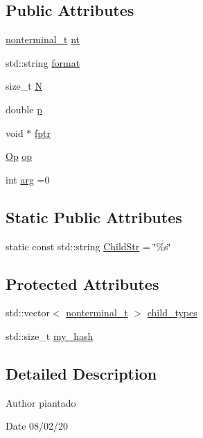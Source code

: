 \subsection*{Public Attributes}
\begin{DoxyCompactItemize}
\item 
\hyperlink{_nonterminal_8h_a1c5bfe9b903f69c83bbde5da7035fef3}{nonterminal\+\_\+t} \hyperlink{class_rule_a980385e76137909454bd6a585bd2e138}{nt}
\item 
std\+::string \hyperlink{class_rule_aa48c15aaaf5242afea0439607f2a2177}{format}
\item 
size\+\_\+t \hyperlink{class_rule_a0a2a742af39b60831ad1ac5eb5ba7498}{N}
\item 
double \hyperlink{class_rule_acd7e4d41d59dec76f60ca16238ab391a}{p}
\item 
void $\ast$ \hyperlink{class_rule_ac0bb1508823495574012004e00477d5e}{fptr}
\item 
\hyperlink{_ops_8h_a588e6b56097e045c733b60d25c4d45ab}{Op} \hyperlink{class_rule_ac98be91bb7865f73af2c0589fd657153}{op}
\item 
int \hyperlink{class_rule_a79eeb901b01047328f093d31724bd512}{arg} =0
\end{DoxyCompactItemize}
\subsection*{Static Public Attributes}
\begin{DoxyCompactItemize}
\item 
static const std\+::string \hyperlink{class_rule_a3ffb425ebd6c508ca47234e3800f769c}{Child\+Str} = \char`\"{}\%s\char`\"{}
\end{DoxyCompactItemize}
\subsection*{Protected Attributes}
\begin{DoxyCompactItemize}
\item 
std\+::vector$<$ \hyperlink{_nonterminal_8h_a1c5bfe9b903f69c83bbde5da7035fef3}{nonterminal\+\_\+t} $>$ \hyperlink{class_rule_afdd38b9432cea46b5cea54b1bb841c07}{child\+\_\+types}
\item 
std\+::size\+\_\+t \hyperlink{class_rule_af2d873c97e2de425f14a5a980dbcc104}{my\+\_\+hash}
\end{DoxyCompactItemize}


\subsection{Detailed Description}
\begin{DoxyAuthor}{Author}
piantado 
\end{DoxyAuthor}
\begin{DoxyDate}{Date}
08/02/20 
\end{DoxyDate}


